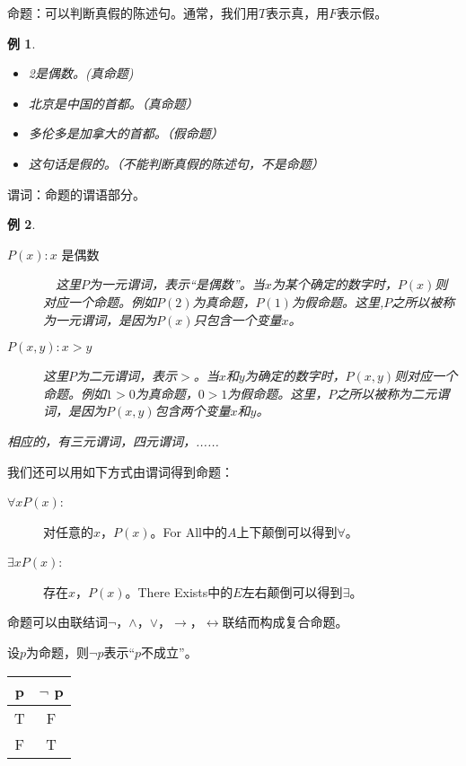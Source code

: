 \documentclass{article}
\newtheorem*{Example}{例}
\begin{document}
\begin{CJK}{UTF8}{gbsn}
  命题：可以判断真假的陈述句。通常，我们用$T$表示真，用$F$表示假。
  \begin{Example}\quad
    
    \begin{itemize}
    \item 2是偶数。(真命题)
    \item 北京是中国的首都。（真命题）
    \item 多伦多是加拿大的首都。（假命题）
    \item 这句话是假的。（不能判断真假的陈述句，不是命题）
    \end{itemize}
  \end{Example}
  谓词：命题的谓语部分。
  
  \begin{Example}\quad
    
    \begin{description}
    \item     [$P(x): x$ 是偶数]　这里$P$为一元谓词，表示“是偶数”。当$x$为某个确定的数字时，$P(x)$则对应一个命题。例如$P(2)$为真命题，$P(1)$为假命题。这里,$P$之所以被称为一元谓词，是因为$P(x)$只包含一个变量$x$。
    \item     [$P(x,y): x >y$]  这里$P$为二元谓词，表示$>$。当$x$和$y$为确定的数字时，$P(x,y)$则对应一个命题。例如$1>0$为真命题，$0>1$为假命题。这里，$P$之所以被称为二元谓词，是因为$P(x,y)$包含两个变量$x$和$y$。
    \end{description}
相应的，有三元谓词，四元谓词，......
\end{Example}

我们还可以用如下方式由谓词得到命题：

\begin{description}
\item [$\forall x P(x)$:] 对任意的$x$，$P(x)$。For All中的$A$上下颠倒可以得到$\forall$。
\item [$\exists x P(x)$:] 存在$x$，$P(x)$。There Exists中的$E$左右颠倒可以得到$\exists$。
\end{description}

命题可以由联结词$\lnot$，$\land$，$\lor$，$\to$，$\leftrightarrow$联结而构成复合命题。

设$p$为命题，则$\lnot p$表示“$p$不成立”。

 \begin{tabular}{c|c}
    p& $\lnot$ p\\
    \hline
    T&F\\
    F&T\\
  \end{tabular}


\end{CJK}
\end{document}
